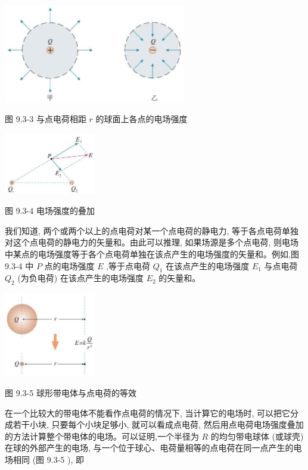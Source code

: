 \documentclass[10pt]{article}
\begin{document}
\begin{center}
\includegraphics[max width=0.6\textwidth]{images/01911d5f-8e38-70c0-b5b8-2b399bd115b6_19_514558.jpg}
\end{center}

图 9.3-3 与点电荷相距 \(r\) 的球面上各点的电场强度

\begin{center}
\includegraphics[max width=0.3\textwidth]{images/01911d5f-8e38-70c0-b5b8-2b399bd115b6_19_242596.jpg}
\end{center}

图 9.3-4 电场强度的叠加

我们知道, 两个或两个以上的点电荷对某一个点电荷的静电力, 等于各点电荷单独对这个点电荷的静电力的矢量和。由此可以推理, 如果场源是多个点电荷, 则电场中某点的电场强度等于各个点电荷单独在该点产生的电场强度的矢量和。例如,图 9.3-4 中 \(P\) 点的电场强度 \(E\) ,等于点电荷 \({Q}_{1}\) 在该点产生的电场强度 \({E}_{1}\) 与点电荷 \({Q}_{2}\) (为负电荷) 在该点产生的电场强度 \({E}_{2}\) 的矢量和。

\begin{center}
\includegraphics[max width=0.3\textwidth]{images/01911d5f-8e38-70c0-b5b8-2b399bd115b6_19_798618.jpg}
\end{center}

图 9.3-5 球形带电体与点电荷的等效

在一个比较大的带电体不能看作点电荷的情况下, 当计算它的电场时, 可以把它分成若干小块, 只要每个小块足够小, 就可以看成点电荷, 然后用点电荷电场强度叠加的方法计算整个带电体的电场。可以证明,一个半径为 \(R\) 的均匀带电球体 (或球壳) 在球的外部产生的电场, 与一个位于球心、电荷量相等的点电荷在同一点产生的电场相同 (图 9.3-5 ), 即
\end{document}
